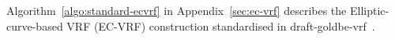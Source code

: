 Algorithm~\ref{algo:standard-ecvrf} in Appendix~\ref{sec:ec-vrf} describes the Elliptic-curve-based VRF (EC-VRF) construction standardised in draft-goldbe-vrf~\cite{goldberg2017draft}.









        






